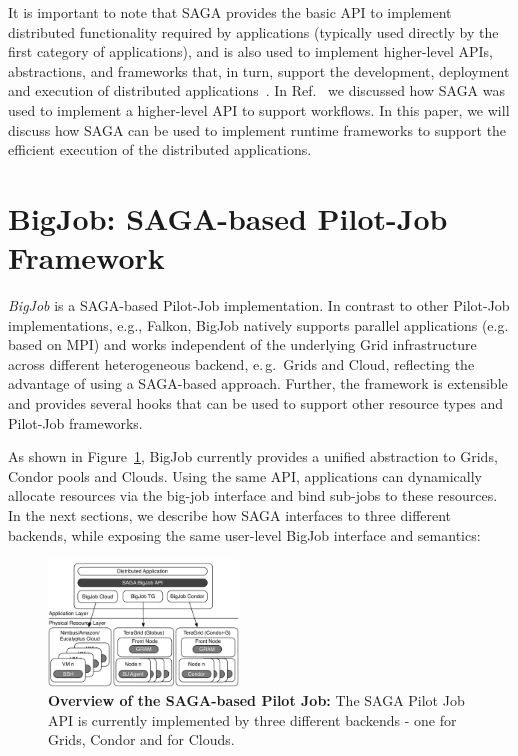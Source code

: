 \documentclass[conference,final]{IEEEtran}
\newcommand{\up}{\vspace*{-1em}}
\newcommand{\alnote}[1]{ {\textcolor{blue} { ***AL: #1 }}}
\newcommand{\jhanote}[1]{ {\textcolor{red} { ***SJ: #1 }}}
\newcommand{\alnote}[1]{}
\newcommand{\jhanote}[1]{}
\begin{document}
It is important to note that SAGA provides the basic API to implement
distributed functionality required by applications (typically used
directly by the first category of applications), and is also used to
implement higher-level APIs, abstractions, and frameworks that, in
turn, support the development, deployment and execution of distributed
applications~\cite{enkf-gmac09}. In Ref.~\cite{sagamontage09} we
discussed how SAGA was used to implement a higher-level API to support
workflows. In this paper, we will discuss how SAGA can be used to
implement runtime frameworks to support the efficient execution of the
distributed applications.

\up
\section{BigJob: SAGA-based Pilot-Job Framework}
\up

\emph{BigJob} is a SAGA-based Pilot-Job implementation. In contrast to
other Pilot-Job implementations, e.g., Falkon, BigJob natively
supports parallel applications (e.g. based on MPI) and works
independent of the underlying Grid infrastructure across different
heterogeneous backend, e.\,g.\ Grids and Cloud, reflecting the
advantage of using a SAGA-based approach. Further, the framework is
extensible and provides several hooks that can be used to support
other resource types and Pilot-Job frameworks.

As shown in Figure~\ref{fig:figures_distributed_pilot_job}, BigJob currently
provides a unified abstraction to Grids, Condor pools and
Clouds. Using the same API, applications can dynamically allocate
resources via the big-job interface and bind sub-jobs to these
resources. In the next sections, we describe how SAGA interfaces to
three different backends, while exposing the same user-level BigJob interface
and semantics:

\up
\begin{figure}[htbp]
    \centering
        \includegraphics[width=0.45\textwidth]{figures/distributed_pilot_job}
        \caption{\textbf{Overview of the SAGA-based Pilot Job:} The
          SAGA Pilot Job API is currently implemented by three
          different backends - one for Grids, Condor and for
          Clouds.\up}
    \label{fig:figures_distributed_pilot_job}
\end{figure}
\end{document}
